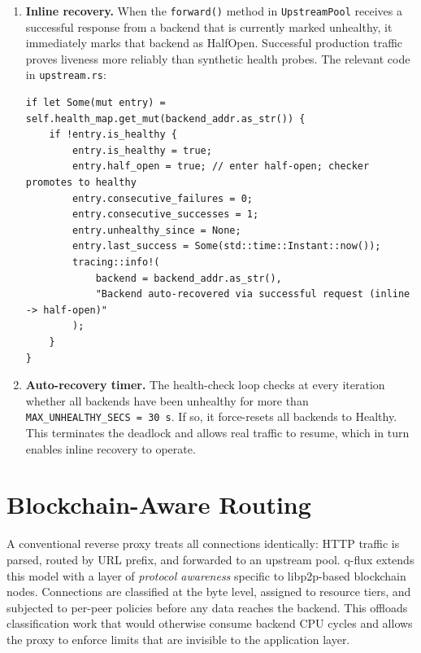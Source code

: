 \documentclass[a4paper, 11pt]{article}
\begin{document}
\begin{enumerate}
  \item \textbf{Inline recovery.}  When the \texttt{forward()} method in
        \texttt{UpstreamPool} receives a successful response from a backend
        that is currently marked unhealthy, it immediately marks that backend as
        HalfOpen.  Successful production traffic proves liveness more reliably
        than synthetic health probes.  The relevant code in \texttt{upstream.rs}:
\begin{lstlisting}[caption={Inline health recovery on successful response.}]
if let Some(mut entry) = self.health_map.get_mut(backend_addr.as_str()) {
    if !entry.is_healthy {
        entry.is_healthy = true;
        entry.half_open = true; // enter half-open; checker promotes to healthy
        entry.consecutive_failures = 0;
        entry.consecutive_successes = 1;
        entry.unhealthy_since = None;
        entry.last_success = Some(std::time::Instant::now());
        tracing::info!(
            backend = backend_addr.as_str(),
            "Backend auto-recovered via successful request (inline -> half-open)"
        );
    }
}
\end{lstlisting}

  \item \textbf{Auto-recovery timer.}  The health-check loop checks at every
        iteration whether all backends have been unhealthy for more than
        \texttt{MAX\_UNHEALTHY\_SECS~=~30\,s}.  If so, it force-resets all
        backends to Healthy.  This terminates the deadlock and allows real
        traffic to resume, which in turn enables inline recovery to operate.
\end{enumerate}%

\section{Blockchain-Aware Routing}
\label{sec:blockchain-routing}

A conventional reverse proxy treats all connections identically: HTTP
traffic is parsed, routed by URL prefix, and forwarded to an upstream
pool. q-flux extends this model with a layer of \emph{protocol
awareness} specific to libp2p-based blockchain nodes. Connections are
classified at the byte level, assigned to resource tiers, and subjected
to per-peer policies before any data reaches the backend. This offloads
classification work that would otherwise consume backend CPU cycles and
allows the proxy to enforce limits that are invisible to the application
layer.
\end{document}
